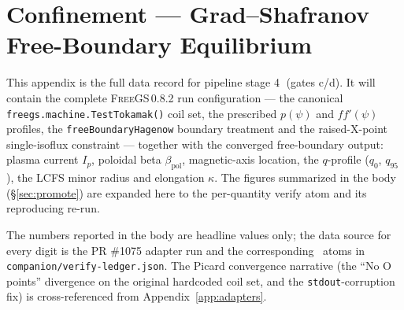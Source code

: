 \section{Confinement --- Grad--Shafranov Free-Boundary Equilibrium}
\label{app:confinement}

This appendix is the full data record for pipeline stage
\textcircled{\scriptsize 4} (gates c/d). It will contain the complete
\textsc{FreeGS}\,0.8.2 run configuration --- the canonical
\texttt{freegs.machine.TestTokamak()} coil set, the prescribed
$p(\psi)$ and $ff'(\psi)$ profiles, the \texttt{freeBoundaryHagenow}
boundary treatment and the raised-X-point single-isoflux constraint
--- together with the converged free-boundary output: plasma current
$I_p$, poloidal beta $\beta_{\text{pol}}$, magnetic-axis location, the
$q$-profile ($q_0$, $q_{95}$), the LCFS minor radius and elongation
$\kappa$. The figures summarized in the body (\S\ref{sec:promote}) are
expanded here to the per-quantity verify atom and its reproducing
re-run.

The numbers reported in the body are headline values only; the data
source for every digit is the PR \#1075 adapter run and the
corresponding \tierGreen\ atoms in \texttt{companion/verify-ledger.json}.
The Picard convergence narrative (the ``No O points'' divergence on the
original hardcoded coil set, and the \texttt{stdout}-corruption fix) is
cross-referenced from Appendix~\ref{app:adapters}.
